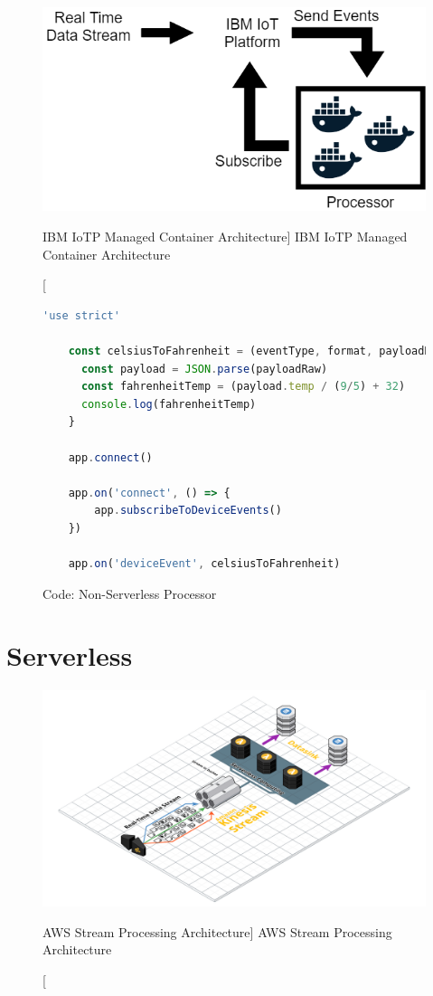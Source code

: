 \begin{figure}[ht]
    \includegraphics[width=0.6\linewidth]{images/streaming/containerArch.png}\centering
    \caption
    [IBM IoTP Managed Container Architecture]
    {IBM IoTP Managed Container Architecture}
    \label{fig:iotpManagedContainer}
\end{figure}

\begin{figure}[ht]
    \begin{lstlisting}[language=js,firstnumber=1]
    'use strict'
        
    const celsiusToFahrenheit = (eventType, format, payloadRaw) => {
      const payload = JSON.parse(payloadRaw)
      const fahrenheitTemp = (payload.temp / (9/5) + 32)
      console.log(fahrenheitTemp)
    }
        
    app.connect()
        
    app.on('connect', () => {
        app.subscribeToDeviceEvents()
    })
        
    app.on('deviceEvent', celsiusToFahrenheit)
    \end{lstlisting}\centering
    \caption{Code: Non-Serverless Processor}
    \label{code:nslProcessor2}
\end{figure}


\section{Serverless}

\begin{figure}[ht]
    \includegraphics[width=\linewidth]{images/streaming/streamingaws.png}\centering
    \caption
    [AWS Stream Processing Architecture]
    {AWS Stream Processing Architecture}
    \label{fig:awsStreamingArchitecture}
\end{figure}


